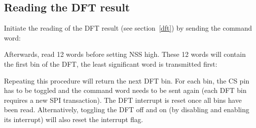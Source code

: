 \documentclass{article}
\newcommand{\bitrect}[2]{
  \begin{pgfonlayer}{foreground}
    \draw [thick] (0,0) rectangle (#1,1);
    \pgfmathsetmacro\result{#1-1}
    \foreach \x in {1,...,\result}
      \draw [thick] (\x,1) -- (\x, 0.8);
  \end{pgfonlayer}
  \bitlabels{#1}{#2}
}
\newcommand{\rwbits}[3]{
  \draw [thick] (#1,0) rectangle ++(#2,1) node[pos=0.5]{#3};
  \pgfmathsetmacro\start{#1+0.5}
  \pgfmathsetmacro\finish{#1+#2-0.5}
}
\newcommand{\robits}[3]{
  \begin{pgfonlayer}{background}
    \draw [thick, fill=lightgray] (#1,0) rectangle ++(#2,1) node[pos=0.5]{#3};
  \end{pgfonlayer}
  \pgfmathsetmacro\start{#1+0.5}
  \pgfmathsetmacro\finish{#1+#2-0.5}
}
\newcommand{\bitlabels}[2]{
  \foreach \bit in {1,...,#1}{
     \pgfmathsetmacro\result{#2}
     \node [above] at (\bit-0.5, 1) {\pgfmathprintnumber{\result}};
   }
}
\begin{document}
\subsection{Reading the DFT result}
Initiate the reading of the DFT result (see section~\ref{dft}) by sending the command word:
\begin{center}
\end{center}
Afterwards, read 12 words before setting NSS high. These 12 words will contain the first bin of the DFT, the least significant word is transmitted first:
\begin{center}
\end{center}
Repeating this procedure will return the next DFT bin. For each bin, the CS pin has to be toggled and the command word needs to be sent again (each DFT bin requires a new SPI transaction). The DFT interrupt is reset once all bins have been read. Alternatively, toggling the DFT off and on (by disabling and enabling its interrupt) will also reset the interrupt flag.
\end{document}
